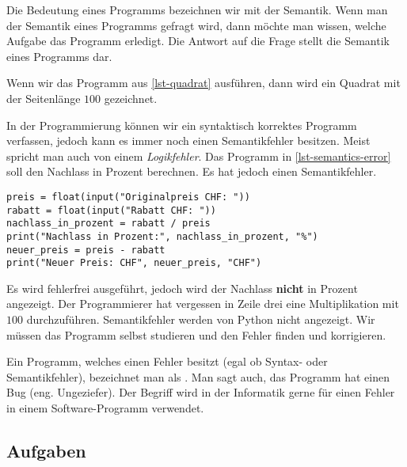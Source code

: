 \begin{definition}[Semantik]
Die Bedeutung eines Programms bezeichnen wir mit der Semantik. Wenn man der Semantik eines Programms gefragt wird, dann möchte man wissen, welche Aufgabe das Programm erledigt. Die Antwort auf die Frage  stellt die Semantik eines Programms dar.
\end{definition}

\begin{example}[Semantik]
Wenn wir das Programm aus \autoref{lst-quadrat} ausführen, dann wird ein Quadrat mit der Seitenlänge $100$ gezeichnet.
\end{example}

In der Programmierung können wir ein syntaktisch korrektes Programm verfassen, jedoch kann es immer noch einen Semantikfehler besitzen. Meist spricht man auch von einem \textit{Logikfehler}. Das Programm in \autoref{lst-semantics-error} soll den Nachlass in Prozent berechnen. Es hat jedoch einen Semantikfehler.

\begin{lstlisting}[caption={Programm mit einem Semantikfehler.}, label=lst-semantics-error, showstringspaces=false]
preis = float(input("Originalpreis CHF: "))
rabatt = float(input("Rabatt CHF: "))
nachlass_in_prozent = rabatt / preis
print("Nachlass in Prozent:", nachlass_in_prozent, "%")
neuer_preis = preis - rabatt
print("Neuer Preis: CHF", neuer_preis, "CHF")
\end{lstlisting}

Es wird fehlerfrei ausgeführt, jedoch wird der Nachlass \textbf{nicht} in Prozent angezeigt. Der Programmierer hat vergessen in Zeile drei eine Multiplikation mit $100$ durchzuführen. Semantikfehler werden von Python nicht angezeigt. Wir müssen das Programm selbst studieren und den Fehler finden und korrigieren.

\begin{definition}[Bug]
Ein Programm, welches einen Fehler besitzt (egal ob Syntax- oder Semantikfehler), bezeichnet man als . Man sagt auch, das Programm hat einen Bug (eng. Ungeziefer). Der Begriff wird in der Informatik gerne für einen Fehler in einem Software-Programm verwendet.
\end{definition}

\subsection{Aufgaben}

